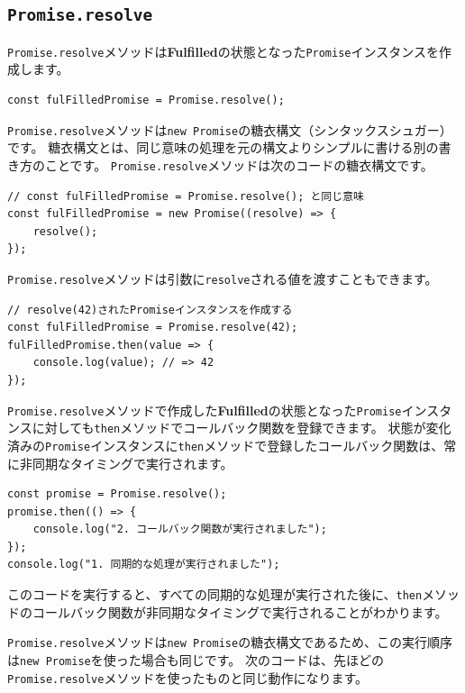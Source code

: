 \hypertarget{promise-resolve}{%
\subsection{\texorpdfstring{\texttt{Promise.resolve}}{Promise.resolve}}\label{promise-resolve}}

\texttt{Promise.resolve}メソッドは\textbf{Fulfilled}の状態となった\texttt{Promise}インスタンスを作成します。

\begin{lstlisting}
const fulFilledPromise = Promise.resolve();
\end{lstlisting}

\texttt{Promise.resolve}メソッドは\texttt{new Promise}の糖衣構文（シンタックスシュガー）です。
糖衣構文とは、同じ意味の処理を元の構文よりシンプルに書ける別の書き方のことです。
\texttt{Promise.resolve}メソッドは次のコードの糖衣構文です。

\begin{lstlisting}
// const fulFilledPromise = Promise.resolve(); と同じ意味
const fulFilledPromise = new Promise((resolve) => {
    resolve();
});
\end{lstlisting}

\texttt{Promise.resolve}メソッドは引数に\texttt{resolve}される値を渡すこともできます。

\begin{lstlisting}
// resolve(42)されたPromiseインスタンスを作成する
const fulFilledPromise = Promise.resolve(42);
fulFilledPromise.then(value => {
    console.log(value); // => 42
});
\end{lstlisting}

\texttt{Promise.resolve}メソッドで作成した\textbf{Fulfilled}の状態となった\texttt{Promise}インスタンスに対しても\texttt{then}メソッドでコールバック関数を登録できます。
状態が変化済みの\texttt{Promise}インスタンスに\texttt{then}メソッドで登録したコールバック関数は、常に非同期なタイミングで実行されます。

\begin{lstlisting}
const promise = Promise.resolve();
promise.then(() => {
    console.log("2. コールバック関数が実行されました");
});
console.log("1. 同期的な処理が実行されました");
\end{lstlisting}

このコードを実行すると、すべての同期的な処理が実行された後に、\texttt{then}メソッドのコールバック関数が非同期なタイミングで実行されることがわかります。

\texttt{Promise.resolve}メソッドは\texttt{new Promise}の糖衣構文であるため、この実行順序は\texttt{new Promise}を使った場合も同じです。
次のコードは、先ほどの\texttt{Promise.resolve}メソッドを使ったものと同じ動作になります。

